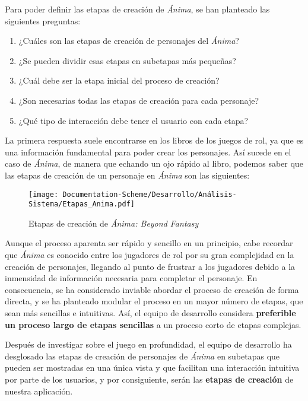 Para poder definir las etapas de creación de \textit{Ánima}, se han planteado las siguientes preguntas:

\begin{enumerate}
    \item ¿Cuáles son las etapas de creación de personajes del \textit{Ánima}?
    \item ¿Se pueden dividir esas etapas en subetapas más pequeñas?
    \item ¿Cuál debe ser la etapa inicial del proceso de creación?
    \item ¿Son necesarias todas las etapas de creación para cada personaje?
    \item ¿Qué tipo de interacción debe tener el usuario con cada etapa?
\end{enumerate}

La primera respuesta suele encontrarse en los libros de los juegos de rol, ya que es una información 
fundamental para poder crear los personajes. Así sucede en el caso de \textit{Ánima}, de manera que 
echando un ojo rápido al libro, podemos saber que las etapas de creación de un personaje en \textit{Ánima}
son las siguientes: \medskip

\begin{figure}[H]
    \centering
    \texttt{[image: Documentation-Scheme/Desarrollo/Análisis-Sistema/Etapas\_Anima.pdf]}
    \caption{Etapas de creación de \textit{Ánima: Beyond Fantasy}}
    \label{Etapas_anima}
\end{figure}

Aunque el proceso aparenta ser rápido y sencillo en un principio, cabe recordar que \textit{Ánima} es conocido 
entre los jugadores de rol por su gran complejidad en la creación de personajes, llegando al punto de frustrar a 
los jugadores debido a la inmensidad de información necesaria para completar el personaje. En consecuencia, se 
ha considerado inviable abordar el proceso de creación de forma directa, y se ha planteado modular el proceso en 
un mayor número de etapas, que sean más sencillas e intuitivas. Así, el equipo de desarrollo considera 
\textbf{preferible un proceso largo de etapas sencillas} a un proceso corto de etapas complejas. \medskip

Después de investigar sobre el juego en profundidad, el equipo de desarrollo ha desglosado las etapas de 
creación de personajes de \textit{Ánima} en subetapas que pueden ser mostradas en una única vista y que 
facilitan una interacción intuitiva por parte de los usuarios, y por consiguiente, 
serán las \textbf{etapas de creación} de nuestra aplicación. \medskip

